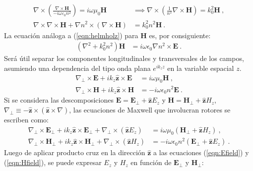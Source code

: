 \begin{align}
	\nabla\times \left(\frac{\nabla\times\textbf{H}}{-i\omega \varepsilon_0 n^2}\right) = i\omega \mu_0 \textbf{H} &\implies \nabla\times \left(\frac{1}{n^2}\nabla\times\textbf{H}\right) = k_0^2 \textbf{H} \ ,
	\nonumber
	\\
	\nabla\times\nabla\times\textbf{H} + \nabla n^2 \times \left( \nabla\times\textbf{H}\right)
	&= 
	  k_0^2 n^2\textbf{H} \ .
	 	\nonumber
\end{align}
La ecuación análoga a (\ref{eqn:helmholz}) para \textbf{H} es, por consiguiente:
\begin{align}
	 \left(\nabla^2  + k_0^2 n^2 \right) \textbf{H} &= i\omega \epsilon_0 \nabla n^2 \times \textbf{E} \ .
	 \label{eqn:helmholzH}
\end{align}
Será útil separar los componentes longitudinales y transversales de los campos, asumiendo una dependencia del tipo onda plana $e^{ik_z z}$ en la variable espacial $z$. 
\begin{align}
	\nabla_\perp \times  \textbf{E} + ik_z \hat{\textbf{z}} \times \textbf{E} &= i\omega\mu_0\textbf{H} \ ,
	\label{eqn:EfieldH}
	\\
	\nabla_\perp \times  \textbf{H} + ik_z \hat{\textbf{z}} \times \textbf{H} &= -i\omega \epsilon_0 n^2 \textbf{E} \ .
	\label{eqn:HfieldE}
\end{align}
Si se considera las descomposiciones $\textbf{E}=\textbf{E}_\perp +\hat{\textbf{z}} E_z$ y $\textbf{H}=\textbf{H}_\perp +\hat{\textbf{z}} H_z$, $\nabla_\perp \equiv - \hat{\textbf{z}}\times (\hat{\textbf{z}}\times\nabla)   $, las ecuaciones de Maxwell que involucran rotores se escriben como:
\begin{align}
	\nabla_\perp \times  \textbf{E}_\perp + ik_z \hat{\textbf{z}} \times \textbf{E}_\perp + \nabla_\perp \times (\hat{\textbf{z}} E_z) &= i\omega\mu_0(\textbf{H}_\perp +\hat{\textbf{z}} H_z) \ ,
	\label{eqn:Efield}
	\\
	\nabla_\perp \times  \textbf{H}_\perp + ik_z \hat{\textbf{z}} \times \textbf{H}_\perp + \nabla_\perp \times (\hat{\textbf{z}} H_z) &= -i\omega \epsilon_0 n^2 (\textbf{E}_\perp +\hat{\textbf{z}} E_z) \ .
	\label{eqn:Hfield}
\end{align}
Luego de aplicar producto cruz en la dirección $\hat{\textbf{z}}$ a las ecuaciones (\ref{eqn:Efield}) y (\ref{eqn:Hfield}), se puede expresar $E_z$ y $H_z$ en función de $\textbf{E}_\perp$ y $\textbf{H}_\perp$:
